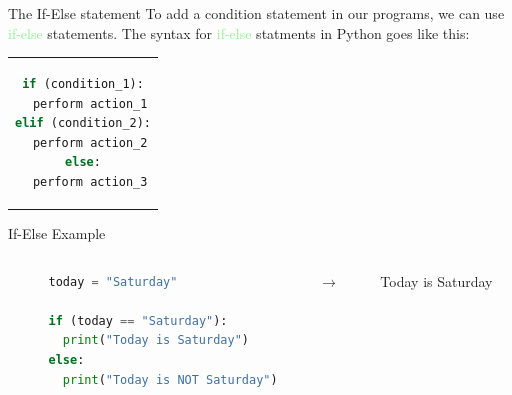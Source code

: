 \documentclass[hyperref={pdfpagemode=FullScreen},aspectratio=169]{beamer}
\begin{document}
  \begin{frame}[fragile]{The If-Else statement} %
    To add a condition statement in our programs, we can use \textcolor{lightGreen}{if-else} statements. The syntax for \textcolor{lightGreen}{if-else} statments in Python goes like this:
    \begin{center}  
      \begin{tabular}{c}  %
        \begin{lstlisting}[language=Python]
if (condition_1):
  perform action_1
elif (condition_2):
  perform action_2
else:
  perform action_3
        \end{lstlisting}
      \end{tabular}
    \end{center}

      
  \end{frame}

  \begin{frame}[fragile]{If-Else Example}
    \begin{columns}[c]
      \begin{column}{0.03\textwidth}
        
      \end{column}

      \hfill 

      \begin{column}{0.48\textwidth}
        \begin{lstlisting}[language=Python]
today = "Saturday"

if (today == "Saturday"):
  print("Today is Saturday")
else: 
  print("Today is NOT Saturday")
        \end{lstlisting}
      \end{column}

      \hfill 

      \begin{column}{0.08\textwidth}
        {\huge $\rightarrow$}
      \end{column}

      \hfill

      \begin{column}{0.38\textwidth}
        Today is Saturday
      \end{column}

    \end{columns}
  
  \end{frame}
\end{document}
